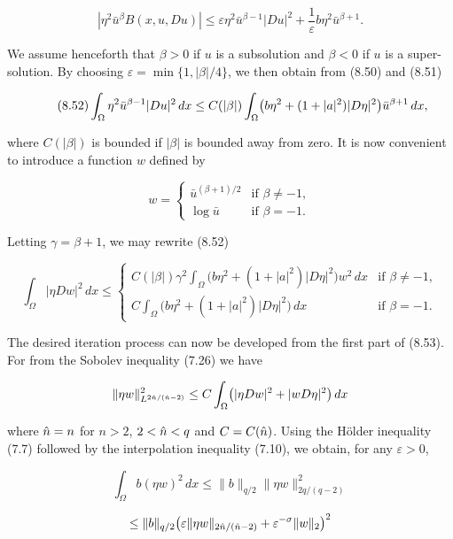 \[
|\eta^2\bar u^\beta B(x,u,Du)|\le \varepsilon\eta^2\bar u^{\beta-1}|Du|^2+\frac{1}{\varepsilon}b\eta^2\bar u^{\beta+1}.
\]



We assume henceforth that $\beta>0$ if $u$ is a subsolution and $\beta<0$ if $u$ is a super-solution. By choosing $\varepsilon=\min\{1,|\beta|/4\}$, we then obtain from (8.50) and (8.51)

\begin{equation}\tag{8.52}
\int_{\Omega}\eta^2\bar u^{\beta-1}|Du|^2\,dx \le C(|\beta|)\int_{\Omega}\bigl(b\eta^2+(1+|a|^2)| D\eta|^2\bigr)\bar u^{\beta+1}\,dx,
\end{equation}

where $C(|\beta|)$ is bounded if $|\beta|$ is bounded away from zero. It is now convenient to introduce a function $w$ defined by

\[
w=
\begin{cases}
\bar u^{(\beta+1)/2} & \text{if } \beta\neq -1,\\
\log \bar u & \text{if } \beta=-1.
\end{cases}
\]

Letting $\gamma=\beta+1$, we may rewrite (8.52)

\begin{equation}\tag{8.53}
\int_{\Omega}|\eta Dw|^2\,dx \le
\begin{cases}
C(|\beta|)\gamma^2\int_{\Omega}\bigl(b\eta^2+(1+|a|^2)| D\eta|^2\bigr)w^2\,dx & \text{if } \beta\neq -1,\\[1.2ex]
C\int_{\Omega}\bigl(b\eta^2+(1+|a|^2)| D\eta|^2\bigr)\,dx & \text{if } \beta=-1.
\end{cases}
\end{equation}

The desired iteration process can now be developed from the first part of (8.53).
For from the Sobolev inequality (7.26) we have

\[
\|\eta w\|_{L^{2\hat n/(\hat n-2)}}^2\le C\int_{\Omega}\bigl(|\eta Dw|^2+|w D\eta|^2\bigr)\,dx
\]

where $\hat n=n$ for $n>2$, $2<\hat n<q$ and $C=C(\hat n)$. Using the Hölder inequality (7.7)
followed by the interpolation inequality (7.10), we obtain, for any $\varepsilon>0$,

\[
\int_{\Omega}b(\eta w)^2\,dx\le \|b\|_{q/2}\|\eta w\|_{2q/(q-2)}^2
\]

\[
\le \|b\|_{q/2}\bigl(\varepsilon\|\eta w\|_{2\hat n/(\hat n-2)}+\varepsilon^{-\sigma}\|w\|_2\bigr)^2
\]

